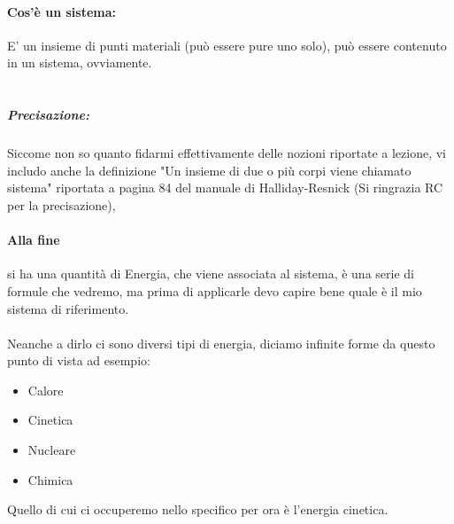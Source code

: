\documentclass[12pt, a4paper, openany, oneside]{book}
\begin{document}
\paragraph{Cos'è un sistema: } E' un insieme di punti materiali (può essere 
pure uno solo), può essere contenuto in un sistema, ovviamente.
\\ \\
\subparagraph{Precisazione: }
Siccome non so quanto fidarmi effettivamente delle nozioni riportate a lezione, 
vi includo anche la definizione "Un insieme di due o più corpi viene chiamato sistema"	
riportata a pagina 84 del manuale di Halliday-Resnick (Si ringrazia RC per la 
precisazione),
\paragraph{Alla fine} si ha una quantità di Energia, che viene associata al sistema, è
una serie di formule che vedremo, ma prima di applicarle devo capire bene quale
è il mio sistema di riferimento.\\ \\
Neanche a dirlo ci sono diversi tipi di energia, diciamo infinite forme da questo
punto di vista ad esempio:
\begin{itemize}
	\item Calore
	\item Cinetica
	\item Nucleare
	\item Chimica
\end{itemize}
Quello di cui ci occuperemo nello specifico per ora è l'energia cinetica.
\end{document}
